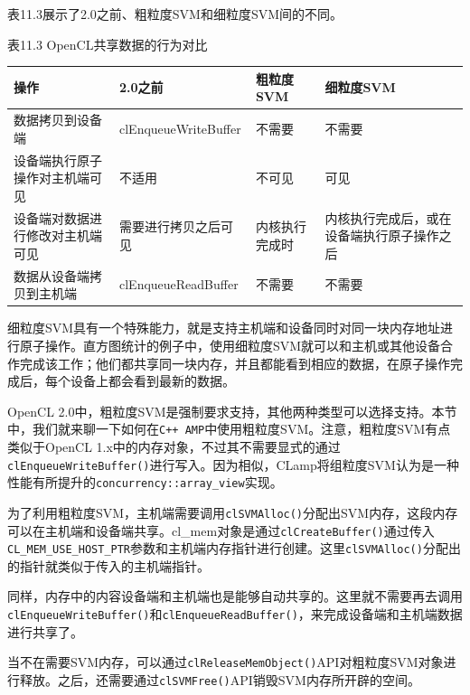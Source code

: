 表11.3展示了2.0之前、粗粒度SVM和细粒度SVM间的不同。

表11.3 OpenCL共享数据的行为对比

\par\medskip\noindent
\begingroup\fontsize{9bp}{12.5bp}\selectfont\renewcommand{\arraystretch}{1.12}
\begin{center}
\begin{tabularx}{\textwidth}{XllX}
\toprule
操作 & 2.0之前 & 粗粒度SVM & 细粒度SVM \\
\midrule
数据拷贝到设备端 & clEnqueueWriteBuffer & 不需要 & 不需要 \\
设备端执行原子操作对主机端可见 & 不适用 & 不可见 & 可见 \\
设备端对数据进行修改对主机端可见 & 需要进行拷贝之后可见 & 内核执行完成时 & 内核执行完成后，或在设备端执行原子操作之后 \\
数据从设备端拷贝到主机端 & clEnqueueReadBuffer & 不需要 & 不需要 \\
\bottomrule
\end{tabularx}
\end{center}
\endgroup
\medskip

细粒度SVM具有一个特殊能力，就是支持主机端和设备同时对同一块内存地址进行原子操作。直方图统计的例子中，使用细粒度SVM就可以和主机或其他设备合作完成该工作；他们都共享同一块内存，并且都能看到相应的数据，在原子操作完成后，每个设备上都会看到最新的数据。

OpenCL 2.0中，粗粒度SVM是强制要求支持，其他两种类型可以选择支持。本节中，我们就来聊一下如何在\texttt{C++ AMP}中使用粗粒度SVM。注意，粗粒度SVM有点类似于OpenCL 1.x中的内存对象，不过其不需要显式的通过\texttt{clEnqueueWriteBuffer()}进行写入。因为相似，CLamp将组粒度SVM认为是一种性能有所提升的\texttt{concurrency::array\_view}实现。

为了利用粗粒度SVM，主机端需要调用\texttt{clSVMAlloc()}分配出SVM内存，这段内存可以在主机端和设备端共享。cl\_\allowbreak{}mem对象是通过\texttt{clCreateBuffer()}通过传入\texttt{CL\_MEM\_USE\_HOST\_PTR}参数和主机端内存指针进行创建。这里\texttt{clSVMAlloc()}分配出的指针就类似于传入的主机端指针。

同样，内存中的内容设备端和主机端也是能够自动共享的。这里就不需要再去调用\texttt{clEnqueueWriteBuffer()}和\texttt{clEnqueueReadBuffer()}，来完成设备端和主机端数据进行共享了。

当不在需要SVM内存，可以通过\texttt{clReleaseMemObject()}API对粗粒度SVM对象进行释放。之后，还需要通过\texttt{clSVMFree()}API销毁SVM内存所开辟的空间。




